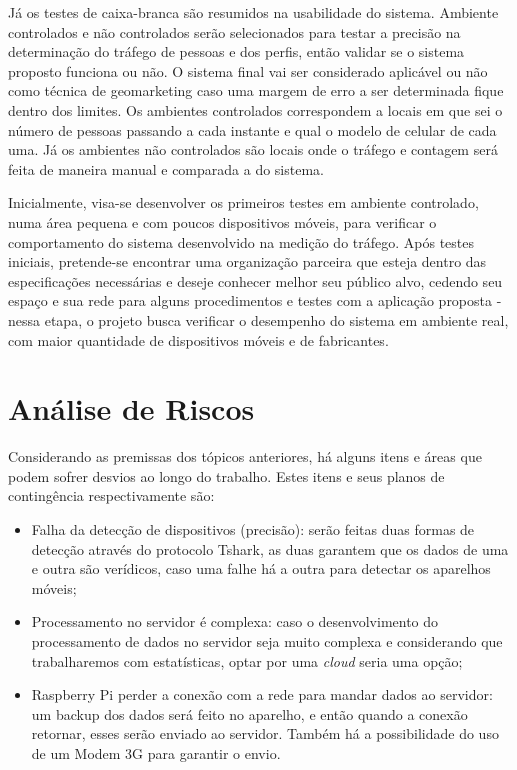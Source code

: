 Já os testes de caixa-branca são resumidos na usabilidade do sistema. Ambiente controlados e não controlados serão selecionados
para testar a precisão na determinação do tráfego de pessoas e dos perfis, então validar se o sistema proposto funciona ou não.
O sistema final vai ser considerado aplicável ou não como técnica de geomarketing caso uma margem de erro a ser determinada fique dentro
dos limites. Os ambientes controlados correspondem a locais em que sei o número de pessoas passando a cada instante e qual o modelo de celular
de cada uma. Já os ambientes não controlados são locais onde o tráfego e contagem será feita de maneira manual e comparada a do sistema.

Inicialmente, visa-se desenvolver os primeiros testes em ambiente
controlado, numa área pequena e com poucos dispositivos móveis, para verificar o
comportamento do sistema desenvolvido na medição do tráfego. Após testes
iniciais, pretende-se encontrar uma organização parceira que esteja dentro das
especificações necessárias e deseje conhecer melhor seu público alvo, cedendo
seu espaço e sua rede para alguns procedimentos e testes com a aplicação proposta
 - nessa etapa, o projeto busca verificar o desempenho do
sistema em ambiente real, com maior quantidade de dispositivos móveis e de
fabricantes.

\section{Análise de Riscos}
Considerando as premissas dos tópicos anteriores, há alguns itens e áreas que podem sofrer desvios ao longo do trabalho. Estes itens e seus planos
de contingência respectivamente são:

\begin{itemize}
  \item Falha da detecção de dispositivos (precisão): serão feitas duas formas de detecção através do protocolo Tshark, as duas garantem que os dados
  de uma e outra são verídicos, caso uma falhe há a outra para detectar os aparelhos móveis;
  \item Processamento no servidor é complexa: caso o desenvolvimento do processamento de dados no servidor seja muito complexa e considerando
  que trabalharemos com estatísticas, optar por uma \emph{cloud} seria uma opção;
  \item Raspberry Pi perder a conexão com a rede para mandar dados ao servidor: um backup dos dados será feito no aparelho, e então quando
  a conexão retornar, esses serão enviado ao servidor. Também há a possibilidade do uso de um Modem 3G para garantir o envio.
\end{itemize}

